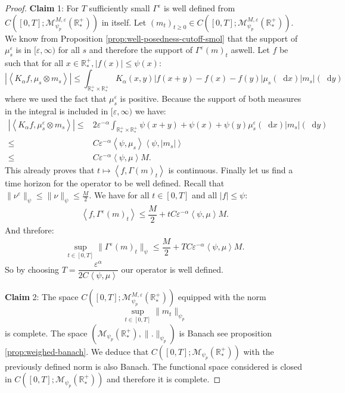 \documentclass[11pt,a4paper]{article}
\newcommand{\RRP}{\mathbb{R}^+_*}
\newcommand{\MC}{\mathcal{M}}
\newcommand{\Proc}[1]{\left(#1\right)_{t\geq 0}}
\newcommand{\brac}[1]{\left\langle#1\right\rangle}
\newcommand{\dd}{\mathop{}\!\mathrm{d}}
\begin{document}
\begin{proof}
    \textbf{Claim} 1: For $T$ sufficiently small $\Gamma^\varepsilon$ is well defined from \(C\left([0,T];\MC^{M,\varepsilon}_{\psi_p}\left(\RRP\right) \right) \) in itself. Let $\Proc{m_t} \in C\left([0,T];\MC^{M,\varepsilon}_{\psi_p}\left(\RRP\right) \right)$. We know from Proposition \ref{prop:well-posedness-cutoff-smol} that the support of $\mu^\varepsilon_s$ is in $[\varepsilon,\infty)$ for all $s$ and therefore the support of $\Gamma^\varepsilon(m)_t$ aswell. Let $f$ be such that for all $x\in \RRP, |f(x)| \leq \psi(x)$:
    \[ \left|\brac{K_\alpha f,\mu_s\otimes m_s}\right| \leq \int_{\RRP\times \RRP} K_\alpha(x,y) \left|f(x+y) - f(x) -f(y)\right| \mu_s(\dd x)|m_s|(\dd y)
    \]
    where we used the fact that $\mu^\varepsilon_s $ is positive. Because the support of both measures in the integral is included in $[\varepsilon,\infty)$ we have:
    \begin{align*}
        \left|\brac{K_\alpha f,\mu^\varepsilon_s\otimes m_s}\right| \leq& 2\varepsilon^{-\alpha} \int_{\RRP\times \RRP} \psi(x+y) + \psi(x) + \psi(y)\mu^\varepsilon_s(\dd x)|m_s|(\dd y) \\
        \leq& C\varepsilon^{-\alpha}\brac{\psi,\mu_s} \brac{\psi,|m_s|}\\
        \leq& C\varepsilon^{-\alpha}\brac{\psi,\mu} M.
    \end{align*}
    This already proves that $t\mapsto \brac{f,\Gamma(m)_t}$ is continuous. Finally let us find a time horizon for the operator to be well defined. Recall that $\| \nu^\varepsilon\|_{\psi} \leq \| \nu\|_{\psi} \leq \frac{M}{2}$. We have for all $t \in [0,T]$ and all $|f|\leq \psi$:
    \begin{align*}
        \brac{f,\Gamma^\varepsilon(m)_t} \leq \dfrac{M}{2} + tC\varepsilon^{-\alpha}\brac{\psi,\mu} M.
    \end{align*}
    And threfore:
    \begin{align*}
        \sup\limits_{t\in [0,T]} \| \Gamma^\varepsilon(m)_t\|_{\psi} \leq \dfrac{M}{2} + TC\varepsilon^{-\alpha}\brac{\psi,\mu} M.
    \end{align*}
    So by choosing $T = \dfrac{\varepsilon^{\alpha}}{2C\brac{\psi,\mu}}$ our operator is well defined.

    \textbf{Claim} 2: The space \(C\left([0,T];\MC^{M,\varepsilon}_{\psi_p}\left(\RRP\right) \right) \) equipped with the norm 
     \[
    \sup\limits_{t \in [0,T]} \|m_t\|_{\psi_p}
    \]
    is complete. The space \(\left(\MC_{\psi_p}\left(\RRP\right),\|.\|_{\psi_p}\right)\) is Banach see proposition \ref{prop:weighed-banach}. We deduce that \(C\left([0,T];\MC_{\psi_p}\left(\RRP\right) \right) \) with the previously defined norm is also Banach. The functional space considered is closed in \(C\left([0,T];\MC_{\psi_p}\left(\RRP\right) \right) \) and therefore it is complete.  
    

\end{proof}
\end{document}
